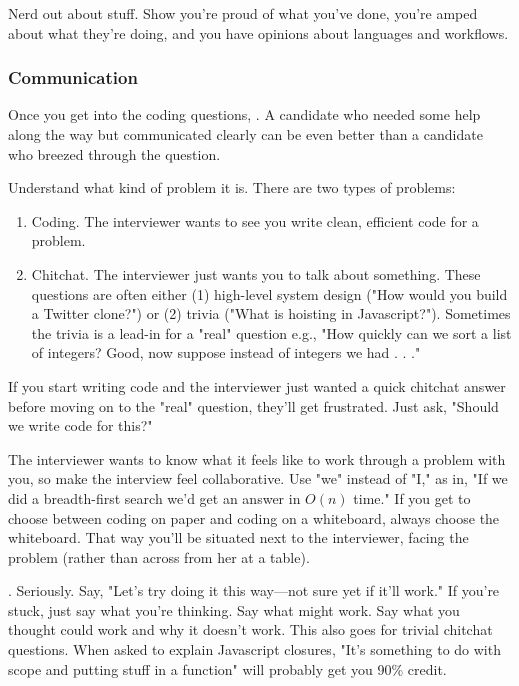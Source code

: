 \documentclass{article}
\begin{document}
Nerd out about stuff. Show you're proud of what you've done, you're amped about what they're doing, and you have opinions about languages and workflows.


\subsubsection{Communication}

Once you get into the coding questions, . A candidate who needed some help along the way but communicated clearly can be even better than a candidate who breezed through the question.

Understand what kind of problem it is. There are two types of problems:

\begin{enumerate}
\item Coding. The interviewer wants to see you write clean, efficient code for a problem.
\item Chitchat. The interviewer just wants you to talk about something. These questions are often either (1) high-level system design ("How would you build a Twitter clone?") or (2) trivia ("What is hoisting in Javascript?"). Sometimes the trivia is a lead-in for a "real" question e.g., "How quickly can we sort a list of integers? Good, now suppose instead of integers we had . . ."
\end{enumerate}


If you start writing code and the interviewer just wanted a quick chitchat answer before moving on to the "real" question, they'll get frustrated. Just ask, "Should we write code for this?"

 The interviewer wants to know what it feels like to work through a problem with you, so make the interview feel collaborative. Use "we" instead of "I," as in, "If we did a breadth-first search we'd get an answer in $O(n)$ time." If you get to choose between coding on paper and coding on a whiteboard, always choose the whiteboard. That way you'll be situated next to the interviewer, facing the problem (rather than across from her at a table).

. Seriously. Say, "Let's try doing it this way—not sure yet if it'll work." If you're stuck, just say what you're thinking. Say what might work. Say what you thought could work and why it doesn't work. This also goes for trivial chitchat questions. When asked to explain Javascript closures, "It's something to do with scope and putting stuff in a function" will probably get you 90\% credit.
\end{document}
